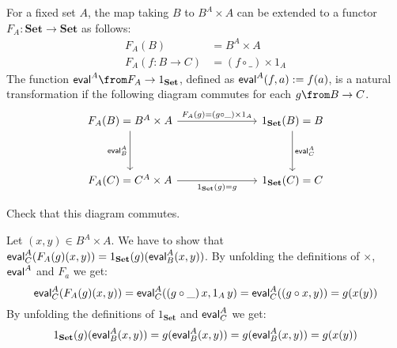 \begin{exercise}
  For a fixed set $A$, the map taking $B$ to $B^A \times A$ can be extended to
  a functor $F_A:\mathbf{Set} \to \mathbf{Set}$ as follows:
  \begin{align*}
    F_A(B) & =  B^A \times A\\
    F_A(f: B \to C) & =  (f \circ \_) \times 1_A
  \end{align*}
  The function $\eval{A} \from F_A \to 1_{\mathbf{Set}}$, defined as $\mathsf{eval}^{A}(f,a) := f(a)$, is a natural transformation if the following diagram commutes for each $g \from B \to C$.
\[
  \begin{tikzcd}
    F_A(B) = B^A \times A \arrow{rrr}{F_A(g)=(g\circ \_) \times 1_A} \arrow{dd}[swap]{\eval{A}_B} & & & 1_{\mathbf{Set}}(B) = B \arrow{dd}{\eval{A}_C} \\
                                                                                           & & & \\
    F_A(C) = C^A \times A \arrow{rrr}[swap]{1_{\mathbf{Set}}(g) = g} & & & 1_{\mathbf{Set}}(C) = C
  \end{tikzcd}
\]

Check that this diagram commutes.
\end{exercise}
\begin{answer}
  Let $(x,y) \in B^A \times A.$ We have to show that $\mathsf{eval}^{A}_C (F_A(g) (x,y)) = 1_{\mathbf {Set}}(g) (\mathsf{eval}^{A}_B (x, y))$.
  By unfolding the definitions of $\times$, $\mathsf{eval}^{A}$ and $F_a$ we get:
  \[
    \mathsf{eval}^{A}_C (F_A(g) (x,y)) =
    \mathsf{eval}^{A}_C ((g \circ \_)\,x, 1_A\,y) =
    \mathsf{eval}^{A}_C ((g \circ x, y)) =
    g (x (y))
    \]
  By unfolding the definitions of $1_{\mathbf {Set}}$ and $\mathsf{eval}^{A}_C$ we get:
  \[
    1_{\mathbf {Set}}(g) (\mathsf{eval}^{A}_B (x, y)) =
    g (\mathsf{eval}^{A}_B (x, y)) =
    g (\mathsf{eval}^{A}_B (x, y)) =
    g (x (y))
    \]
\end{answer}

